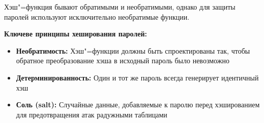  Хэш"=функция бывают обратимыми и необратимыми, однако для защиты паролей используют исключительно необратимые функции.

\textbf{Ключеве принципы хеширования паролей:}
\begin{itemize}
	\item{\textbf{Необратимость:} Хэш"=функции должны быть спроектированы так, чтобы обратное преобразование хэша в исходный пароль было невозможно}	
	\item{\textbf{Детерминированность:} Один и тот же пароль всегда генерирует идентичный хэш}
	\item{\textbf{ Соль (salt):} Случайные данные, добавляемые к паролю перед хэшированием для предотвращения атак радужными таблицами}
\end{itemize}
